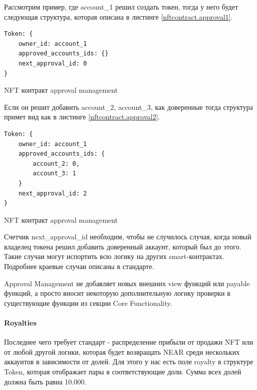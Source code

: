 Рассмотрим пример, где account\_1 решил создать токен, тогда у него будет следующая структура, которая описана в листинге {\color{blue}\ref{nftcontract.approval1}}.
\begin{listing}
\begin{verbatim}
Token: {
    owner_id: account_1
    approved_accounts_ids: {}
    next_approval_id: 0
}
\end{verbatim}
\caption{NFT контракт approval management}
\label{nftcontract.approval1}
\end{listing}

Если он решит добавить account\_2, account\_3, как доверенные тогда структура примет вид как в листинге {\color{blue}\ref{nftcontract.approval2}}.
\begin{listing}
\begin{verbatim}
Token: {
    owner_id: account_1
    approved_accounts_ids: {
        account_2: 0,
        account_3: 1
    }
    next_approval_id: 2
}
\end{verbatim}
\caption{NFT контракт approval management}
\label{nftcontract.approval2}
\end{listing}

Счетчик next\_approval\_id  необходим, чтобы не случилось случая, когда новый владелец токена решил добавить доверенный аккаунт, который был до этого. Такие случаи могут испортить всю логику на других smart-контрактах.
Подробнее краевые случаи описаны в стандарте\cite{approvalstandard}.

Approval Management не добавляет новых внешних view функций или payable функций, а просто вносит некоторую дополнительную логику проверки в существующие функции из секции Core Functionality.

\paragraph{Royalties}
\label{section.main.smart.struct.royalties}

Последнее чего требует стандарт - распределение прибыли от продажи NFT или от любой другой логики, которая будет возвращать NEAR среди нескольких аккаунтов в зависимости от долей\cite{royaltystandard}.
Для этого у нас есть поле royalty в структуре Token, которая отображает пары в соответствующие доли. Сумма всех долей должна быть равна 10.000.

